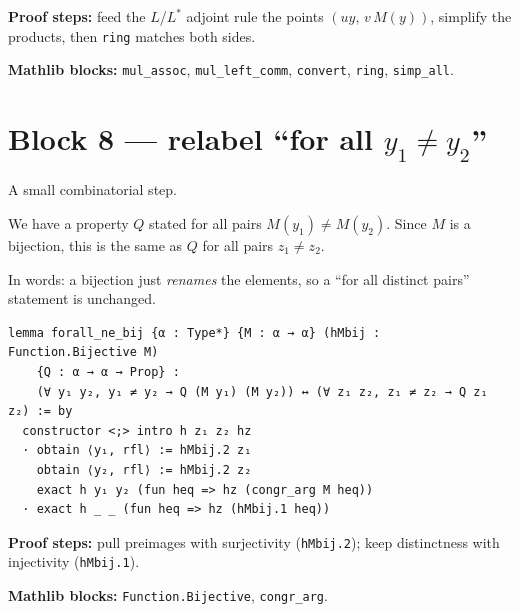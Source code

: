 \documentclass[11pt]{article}
\begin{document}
\textbf{Proof steps:} feed the $L$/$L^{*}$ adjoint rule the points
$(uy,\, v\,M(y))$, simplify the products, then \texttt{ring} matches both
sides.

\textbf{Mathlib blocks:} \texttt{mul\_assoc}, \texttt{mul\_left\_comm},
\texttt{convert}, \texttt{ring}, \texttt{simp\_all}.

\section{Block 8 --- relabel ``for all $y_1\neq y_2$''}

A small combinatorial step.

We have a property $Q$ stated for all pairs $M(y_1)\neq M(y_2)$.
Since $M$ is a bijection, this is the same as $Q$ for all pairs
$z_1\neq z_2$.

In words: a bijection just \emph{renames} the elements, so a
``for all distinct pairs'' statement is unchanged.

\begin{center}
\end{center}

\begin{lstlisting}
lemma forall_ne_bij {α : Type*} {M : α → α} (hMbij : Function.Bijective M)
    {Q : α → α → Prop} :
    (∀ y₁ y₂, y₁ ≠ y₂ → Q (M y₁) (M y₂)) ↔ (∀ z₁ z₂, z₁ ≠ z₂ → Q z₁ z₂) := by
  constructor <;> intro h z₁ z₂ hz
  · obtain ⟨y₁, rfl⟩ := hMbij.2 z₁
    obtain ⟨y₂, rfl⟩ := hMbij.2 z₂
    exact h y₁ y₂ (fun heq => hz (congr_arg M heq))
  · exact h _ _ (fun heq => hz (hMbij.1 heq))
\end{lstlisting}

\textbf{Proof steps:} pull preimages with surjectivity (\texttt{hMbij.2}); keep
distinctness with injectivity (\texttt{hMbij.1}).

\textbf{Mathlib blocks:} \texttt{Function.Bijective},
\texttt{congr\_arg}.

\end{document}
